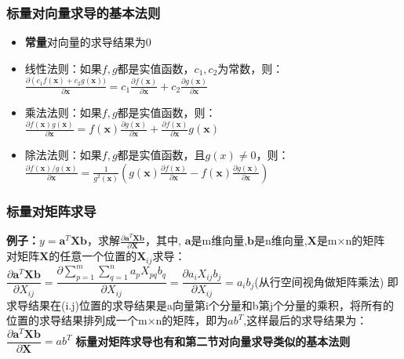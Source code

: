 \documentclass[UTF8]{article}
\begin{document}
    \subsubsection{标量对向量求导的基本法则}
    \begin{itemize}
        \item \textbf{常量}对向量的求导结果为0
        \item 线性法则：如果$f,g$都是实值函数，$c_1,c_2$为常数，则：$\frac{\partial\left(c_{1} f(\mathbf{x})+c_{2} g(\mathbf{x}))\right.}{\partial \mathbf{x}}=c_{1} \frac{\partial f(\mathbf{x})}{\partial \mathbf{x}}+c_{2} \frac{\partial g(\mathbf{x})}{\partial \mathbf{x}}$
        \item 乘法法则：如果$f,g$都是实值函数，则：$\frac{\partial f(\mathbf{x}) g(\mathbf{x})}{\partial \mathbf{x}}=f(\mathbf{x}) \frac{\partial g(\mathbf{x})}{\partial \mathbf{x}}+\frac{\partial f(\mathbf{x})}{\partial \mathbf{x}} g(\mathbf{x})$
        \item 除法法则：如果$f,g$都是实值函数，且$g(x)≠0$，则：$\frac{\partial f(\mathbf{x}) / g(\mathbf{x})}{\partial \mathbf{x}}=\frac{1}{g^{2}(\mathbf{x})}\left(g(\mathbf{x}) \frac{\partial f(\mathbf{x})}{\partial \mathbf{x}}-f(\mathbf{x}) \frac{\partial g(\mathbf{x})}{\partial \mathbf{x}}\right)$
    \end{itemize}

    \subsubsection{标量对矩阵求导}
    \textbf{例子：}$y=\mathbf{a}^{T} \mathbf{X} \mathbf{b}$，求解$\frac{\partial \mathbf{a}^{T} \mathbf{X} \mathbf{b}}{\partial \mathbf{X}}$，其中, $\bm{a}$是m维向量,$\bm{b}$是n维向量,$\bm{X}$是m×n的矩阵
    \\
    对矩阵$\bm{X}$的任意一个位置的$\bm{X}_{ij}$求导：
    \\
    $\dfrac{\partial \mathbf{a}^{T} \mathbf{X} \mathbf{b}}{\partial X_{i j}}=\dfrac{\partial \sum_{p=1}^{m} \sum_{q=1}^{n} a_{p} X_{p q} b_{q}}{\partial X_{i j}}=\dfrac{\partial a_{i} X_{i j} b_{j}}{\partial X_{i j}}=a_{i} b_{j}$(从行空间视角做矩阵乘法)
    即求导结果在(i.j)位置的求导结果是a向量第i个分量和b第j个分量的乘积，将所有的位置的求导结果排列成一个m×n的矩阵，即为$ab^T$,这样最后的求导结果为：$\dfrac{\partial \mathbf{a}^{T} \mathbf{X} \mathbf{b}}{\partial \mathbf{X}}=a b^{T}$
    \textbf{标量对矩阵求导也有和第二节对向量求导类似的基本法则}
\end{document}
